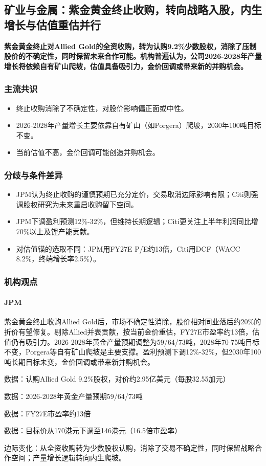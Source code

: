 \documentclass[11pt]{ctexart}
\begin{document}
\subsection{矿业与金属：紫金黄金终止收购，转向战略入股，内生增长与估值重估并行}
\textbf{紫金黄金终止对Allied Gold的全资收购，转为认购9.2\%少数股权，消除了压制股价的不确定性，同时保留未来合作可能。机构普遍认为，公司2026-2028年产量增长将依赖自有矿山爬坡，估值具备吸引力，金价回调或带来新的并购机会。}
\subsubsection*{主流共识}
\begin{itemize}
  \item 终止收购消除了不确定性，对股价影响偏正面或中性。
  \item 2026-2028年产量增长主要依靠自有矿山（如Porgera）爬坡，2030年100吨目标不变。
  \item 当前估值不高，金价回调可能创造并购机会。
\end{itemize}
\subsubsection*{分歧与条件差异}
\begin{itemize}
  \item JPM认为终止收购的谨慎预期已充分定价，交易取消边际影响有限；Citi则强调股权研究为未来重启收购留下空间。
  \item JPM下调盈利预测12\%-32\%，但维持长期逻辑；Citi更关注上半年利润同比增70\%以上及锂产能贡献。
  \item 对估值锚的选取不同：JPM用FY27E P/E约13倍，Citi用DCF（WACC 8.2\%，终端增长率2.5\%）。
\end{itemize}
\subsubsection*{机构观点}
\paragraph{JPM} 紫金黄金终止收购Allied Gold后，市场不确定性消除，股价相对同业落后约20\%的折价有望修复。剔除Allied并表贡献，按当前金价重估，FY27E市盈率约13倍，估值仍有吸引力。2026-2028年黄金产量预期调整为59/64/73吨，2028年70-75吨目标不变，Porgera等自有矿山爬坡是主要支撑。盈利预测下调12\%-32\%，但2030年100吨长期目标未变，金价回调或带来新并购机会。
{\small\color{refgray}数据：认购Allied Gold 9.2\%股权，对价约2.95亿美元（每股32.55加元）\par}
{\small\color{refgray}数据：2026-2028年黄金产量预期59/64/73吨\par}
{\small\color{refgray}数据：FY27E市盈率约13倍\par}
{\small\color{refgray}数据：目标价从170港元下调至146港元（16.5倍市盈率）\par}
{\small\color{refgray}边际变化：从全资收购转为少数股权认购，消除了交易不确定性，同时保留战略合作空间；产量增长逻辑转向内生爬坡。\par}
\end{document}
